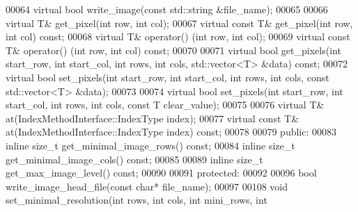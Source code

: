 \begin{DoxyCode}
00064         \textcolor{keyword}{virtual} \textcolor{keywordtype}{bool} write_image(\textcolor{keyword}{const} std::string &file\_name);
00065 
00066         \textcolor{keyword}{virtual} T& get_pixel(\textcolor{keywordtype}{int} row, \textcolor{keywordtype}{int} col);
00067         \textcolor{keyword}{virtual} \textcolor{keyword}{const} T& get_pixel(\textcolor{keywordtype}{int} row, \textcolor{keywordtype}{int} col) \textcolor{keyword}{const};
00068         \textcolor{keyword}{virtual} T& operator() (\textcolor{keywordtype}{int} row, \textcolor{keywordtype}{int} col);
00069         \textcolor{keyword}{virtual} \textcolor{keyword}{const} T& operator() (\textcolor{keywordtype}{int} row, \textcolor{keywordtype}{int} col) \textcolor{keyword}{const};
00070 
00071         \textcolor{keyword}{virtual} \textcolor{keywordtype}{bool} get_pixels(\textcolor{keywordtype}{int} start\_row, \textcolor{keywordtype}{int} start\_col, \textcolor{keywordtype}{int} rows, \textcolor{keywordtype}{int} 
      cols, std::vector<T> &data) \textcolor{keyword}{const};
00072         \textcolor{keyword}{virtual} \textcolor{keywordtype}{bool} set\_pixels(\textcolor{keywordtype}{int} start\_row, \textcolor{keywordtype}{int} start\_col, \textcolor{keywordtype}{int} rows, \textcolor{keywordtype}{int} 
      cols, \textcolor{keyword}{const} std::vector<T> &data);
00073 
00074         \textcolor{keyword}{virtual} \textcolor{keywordtype}{bool} set\_pixels(\textcolor{keywordtype}{int} start\_row, \textcolor{keywordtype}{int} start\_col, \textcolor{keywordtype}{int} rows, \textcolor{keywordtype}{int} 
      cols, \textcolor{keyword}{const} T clear\_value);
00075 
00076         \textcolor{keyword}{virtual} T& at(IndexMethodInterface::IndexType index);
00077         \textcolor{keyword}{virtual} \textcolor{keyword}{const} T& at(IndexMethodInterface::IndexType index) \textcolor{keyword}{const};
00078 
00079 \textcolor{keyword}{public}:
00083         \textcolor{keyword}{inline} \textcolor{keywordtype}{size\_t} get_minimal_image_rows() \textcolor{keyword}{const};
00084         \textcolor{keyword}{inline} \textcolor{keywordtype}{size\_t} get\_minimal\_image\_cols() \textcolor{keyword}{const};
00085 
00089         \textcolor{keyword}{inline} \textcolor{keywordtype}{size\_t} get_max_image_level() \textcolor{keyword}{const};
00090 
00091 \textcolor{keyword}{protected}:
00092 
00096         \textcolor{keywordtype}{bool} write_image_head_file(\textcolor{keyword}{const} \textcolor{keywordtype}{char}* file\_name);
00097 
00108         \textcolor{keywordtype}{void} set_minimal_resolution(\textcolor{keywordtype}{int} rows, \textcolor{keywordtype}{int} cols, \textcolor{keywordtype}{int} mini\_rows, \textcolor{keywordtype}{int} 

\end{DoxyCode}
